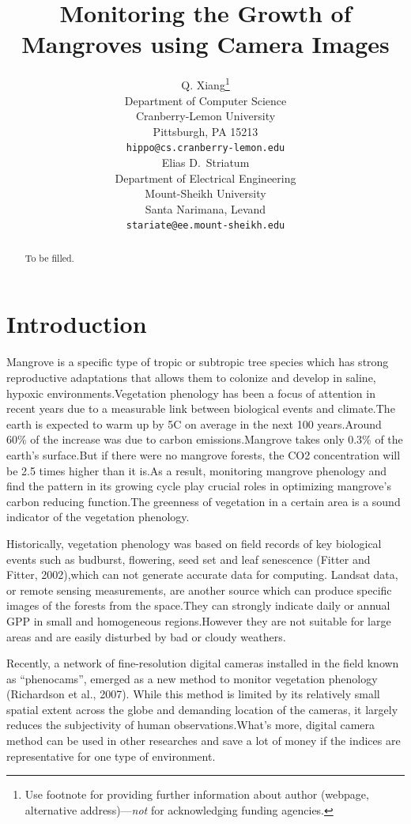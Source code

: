 \documentclass{article}
\title{Monitoring the Growth of Mangroves using Camera Images}
\author{
  Q. Xiang\thanks{Use footnote for providing further
    information about author (webpage, alternative
    address)---\emph{not} for acknowledging funding agencies.} \\
  Department of Computer Science\\
  Cranberry-Lemon University\\
  Pittsburgh, PA 15213 \\
  \texttt{hippo@cs.cranberry-lemon.edu} \\
   \And
 Elias D.~Striatum \\
  Department of Electrical Engineering\\
  Mount-Sheikh University\\
  Santa Narimana, Levand \\
  \texttt{stariate@ee.mount-sheikh.edu} \\
}
\begin{document}
\maketitle

\begin{abstract}
To be filled.
\end{abstract}







\section{Introduction}

Mangrove is a specific type of tropic or subtropic tree species which has strong
reproductive adaptations that allows them to colonize and develop in saline, hypoxic
environments.Vegetation phenology has been a focus of attention in recent years due
to a measurable link between biological events and climate.The earth is expected to
warm up by 5\°C on average in the next 100 years.Around 60\% of the increase was
due to carbon emissions.Mangrove takes only 0.3\% of the earth’s surface.But if there
were no mangrove forests, the CO2 concentration will be 2.5 times higher than it
is.As a result, monitoring mangrove phenology and find the pattern in its growing
cycle play crucial roles in optimizing mangrove’s carbon reducing function.The
greenness of vegetation in a certain area is a sound indicator of the vegetation
phenology.

Historically, vegetation phenology was based on field records of key biological
events such as budburst, flowering, seed set and leaf senescence (Fitter and Fitter,
2002),which can not generate accurate data for computing. Landsat data, or remote
sensing measurements, are another source which can produce specific images of the
forests from the space.They can strongly indicate daily or annual GPP in small and
homogeneous regions.However they are not suitable for large areas and are easily
disturbed by bad or cloudy weathers.

Recently, a network of fine-resolution digital cameras installed in the field known as
“phenocams”, emerged as a new method to monitor vegetation phenology
(Richardson et al., 2007). While this method is limited by its relatively small spatial
extent across the globe and demanding location of the cameras, it largely reduces the
subjectivity of human observations.What’s more, digital camera method can be used
in other researches and save a lot of money if the indices are representative for one
type of environment.
\end{document}
